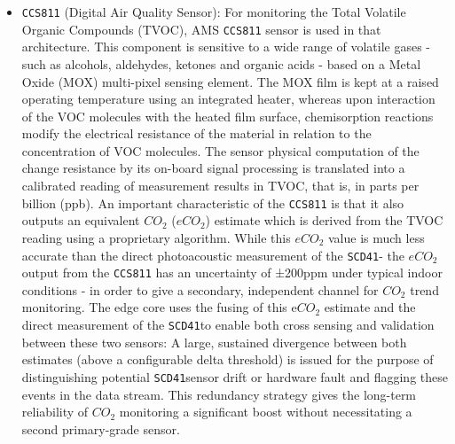 \documentclass[conference]{IEEEtran}
\begin{document}
\begin{itemize}
The \texttt{SPS30} use of a mechanical fan brings a crucial power constraint for the system: the fan must have a separate 5V high current power rail, which is not allowed to the shared 3.3V low power logic infrastructure of the \texttt{nRF52840}. The engineering implications of this requirement are discussed in detail in Section III-C. Communication with the \texttt{nRF52840} is done via UART at 115,200 baud instead of I2C because the continuous fan operation produces periodic electrical noise which would intercept using I2C bus transmissions defined on a shared rail - a failure mode that the manufacturer has documented as well as confirmed through early prototype tests.

\item \texttt{CCS811} (Digital Air Quality Sensor): For monitoring the Total Volatile Organic Compounds (TVOC), AMS \texttt{CCS811} sensor is used in that architecture. This component is sensitive to a wide range of volatile gases - such as alcohols, aldehydes, ketones and organic acids - based on a Metal Oxide (MOX) multi-pixel sensing element. The MOX film is kept at a raised operating temperature using an integrated heater, whereas upon interaction of the VOC molecules with the heated film surface, chemisorption reactions modify the electrical resistance of the material in relation to the concentration of VOC molecules. The sensor physical computation of the change resistance by its on-board signal processing is translated into a calibrated reading of measurement results in TVOC, that is, in parts per billion (ppb). An important characteristic of the \texttt{CCS811} is that it also outputs an equivalent $CO_2$ ($eCO_2$) estimate which is derived from the TVOC reading using a proprietary algorithm. While this $eCO_2$ value is much less accurate than the direct photoacoustic measurement of the \texttt{SCD41}- the $eCO_2$ output from the \texttt{CCS811} has an uncertainty of ±200ppm under typical indoor conditions - in order to give a secondary, independent channel for $CO_2$ trend monitoring. The edge core uses the fusing of this e$CO_2$ estimate and the direct measurement of the \texttt{SCD41}to enable both cross sensing and validation between these two sensors: A large, sustained divergence between both estimates (above a configurable delta threshold) is issued for the purpose of distinguishing potential \texttt{SCD41}sensor drift or hardware fault and flagging these events in the data stream. This redundancy strategy gives the long-term reliability of $CO_2$ monitoring a significant boost without necessitating a second primary-grade sensor.

\end{itemize}
\end{document}
